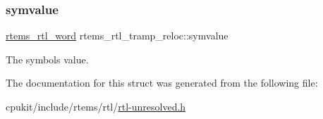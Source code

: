 \subsubsection{\texorpdfstring{symvalue}{symvalue}}
{\footnotesize\ttfamily \mbox{\hyperlink{rtl-unresolved_8h_a5ab1ca8c94e49686f84f5ccf0731f0e6}{rtems\+\_\+rtl\+\_\+word}} rtems\+\_\+rtl\+\_\+tramp\+\_\+reloc\+::symvalue}

The symbol\textquotesingle{}s value. 

The documentation for this struct was generated from the following file\+:\begin{DoxyCompactItemize}
\item 
cpukit/include/rtems/rtl/\mbox{\hyperlink{rtl-unresolved_8h}{rtl-\/unresolved.\+h}}\end{DoxyCompactItemize}
